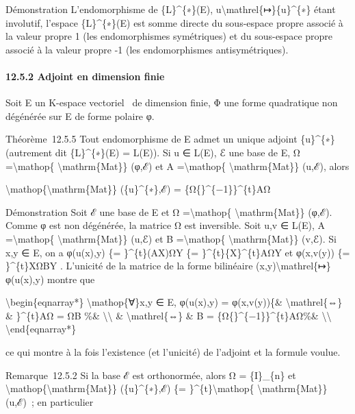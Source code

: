 \documentclass[]{article}
\begin{document}
Démonstration L'endomorphisme de \{L\}\^{}\{∗\}(E),
u\textbackslash{}mathrel\{↦\}\{u\}\^{}\{∗\} étant involutif, l'espace
\{L\}\^{}\{∗\}(E) est somme directe du sous-espace propre associé à la
valeur propre 1 (les endomorphismes symétriques) et du sous-espace
propre associé à la valeur propre -1 (les endomorphismes
antisymétriques).

\paragraph{12.5.2 Adjoint en dimension finie}

Soit E un K-espace vectoriel ~de dimension finie, Φ une forme
quadratique non dégénérée sur E de forme polaire φ.

Théorème~12.5.5 Tout endomorphisme de E admet un unique adjoint
\{u\}\^{}\{∗\} (autrement dit \{L\}\^{}\{∗\}(E) = L(E)). Si u ∈ L(E), ℰ
une base de E, Ω =\textbackslash{}mathop\{
\textbackslash{}mathrm\{Mat\}\} (φ,ℰ) et A =\textbackslash{}mathop\{
\textbackslash{}mathrm\{Mat\}\} (u,ℰ), alors

\textbackslash{}mathop\{\textbackslash{}mathrm\{Mat\}\}
(\{u\}\^{}\{∗\},ℰ) = \{Ω\{\}\^{}\{−1\}\}\^{}\{t\}AΩ

Démonstration Soit ℰ une base de E et Ω =\textbackslash{}mathop\{
\textbackslash{}mathrm\{Mat\}\} (φ,ℰ). Comme φ est non dégénérée, la
matrice Ω est inversible. Soit u,v ∈ L(E), A =\textbackslash{}mathop\{
\textbackslash{}mathrm\{Mat\}\} (u,ℰ) et B =\textbackslash{}mathop\{
\textbackslash{}mathrm\{Mat\}\} (v,ℰ). Si x,y ∈ E, on a φ(u(x),y) \{=
\}\^{}\{t\}(AX)ΩY \{= \}\^{}\{t\}\{X\}\^{}\{t\}AΩY et φ(x,v(y)) \{=
\}\^{}\{t\}XΩBY . L'unicité de la matrice de la forme bilinéaire
(x,y)\textbackslash{}mathrel\{↦\}φ(u(x),y) montre que

\textbackslash{}begin\{eqnarray*\} \textbackslash{}mathop\{∀\}x,y ∈ E,
φ(u(x),y) = φ(x,v(y))\{\& \textbackslash{}mathrel\{⇔\} \& \}\^{}\{t\}AΩ
= ΩB \%\& \textbackslash{}\textbackslash{} \&
\textbackslash{}mathrel\{⇔\} \& B = \{Ω\{\}\^{}\{−1\}\}\^{}\{t\}AΩ\%\&
\textbackslash{}\textbackslash{} \textbackslash{}end\{eqnarray*\}

ce qui montre à la fois l'existence (et l'unicité) de l'adjoint et la
formule voulue.

Remarque~12.5.2 Si la base ℰ est orthonormée, alors Ω = \{I\}\_\{n\} et
\textbackslash{}mathop\{\textbackslash{}mathrm\{Mat\}\}
(\{u\}\^{}\{∗\},ℰ) \{= \}\^{}\{t\}\textbackslash{}mathop\{
\textbackslash{}mathrm\{Mat\}\} (u,ℰ)~; en particulier
\end{document}
